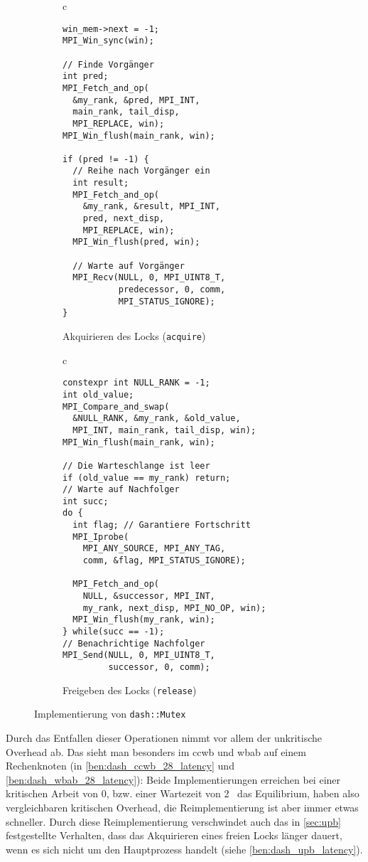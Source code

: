 \begin{figure}[h]
    \begin{subfigure}{.5\textwidth}
        \centering
        \begin{tabular}{c}\begin{lstlisting}
win_mem->next = -1;
MPI_Win_sync(win);

// Finde Vorgänger
int pred;
MPI_Fetch_and_op(
  &my_rank, &pred, MPI_INT,
  main_rank, tail_disp,
  MPI_REPLACE, win);
MPI_Win_flush(main_rank, win);

if (pred != -1) {
  // Reihe nach Vorgänger ein
  int result;
  MPI_Fetch_and_op(
    &my_rank, &result, MPI_INT,
    pred, next_disp,
    MPI_REPLACE, win);
  MPI_Win_flush(pred, win);

  // Warte auf Vorgänger
  MPI_Recv(NULL, 0, MPI_UINT8_T,
           predecessor, 0, comm,
           MPI_STATUS_IGNORE);
}
        \end{lstlisting}\end{tabular}
        \caption{Akquirieren des Locks (\texttt{acquire})}
        \label{fig:dash_acquire}
    \end{subfigure}
    \begin{subfigure}{.5\textwidth}
        \centering
        \begin{tabular}{c}\begin{lstlisting}
constexpr int NULL_RANK = -1;
int old_value;
MPI_Compare_and_swap(
  &NULL_RANK, &my_rank, &old_value,
  MPI_INT, main_rank, tail_disp, win);
MPI_Win_flush(main_rank, win);

// Die Warteschlange ist leer
if (old_value == my_rank) return;
// Warte auf Nachfolger
int succ;
do {
  int flag; // Garantiere Fortschritt
  MPI_Iprobe(
    MPI_ANY_SOURCE, MPI_ANY_TAG,
    comm, &flag, MPI_STATUS_IGNORE);

  MPI_Fetch_and_op(
    NULL, &successor, MPI_INT,
    my_rank, next_disp, MPI_NO_OP, win);
  MPI_Win_flush(my_rank, win);
} while(succ == -1);
// Benachrichtige Nachfolger
MPI_Send(NULL, 0, MPI_UINT8_T,
         successor, 0, comm);
        \end{lstlisting}\end{tabular}
        \caption{Freigeben des Locks (\texttt{release})}
        \label{fig:dash_release}
    \end{subfigure}
    \caption{Implementierung von \texttt{dash::Mutex}}
    \label{fig:dash_code}
\end{figure}

Durch das Entfallen dieser Operationen nimmt vor allem der unkritische Overhead ab.
Das sieht man besonders im \gls{ccwb} und \gls{wbab} auf einem Rechenknoten
(in \autoref{ben:dash_ccwb_28_latency} und \autoref{ben:dash_wbab_28_latency}):
Beide Implementierungen erreichen bei einer kritischen Arbeit von 0,
bzw. einer Wartezeit von 2~ das Equilibrium,
haben also vergleichbaren kritischen Overhead,
die Reimplementierung ist aber immer etwas schneller.
Durch diese Reimplementierung verschwindet auch das in \autoref{sec:upb} festgestellte Verhalten,
dass das Akquirieren eines freien Locks länger dauert,
wenn es sich nicht um den Hauptprozess handelt (siehe \autoref{ben:dash_upb_latency}).

